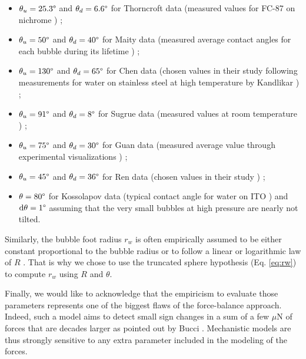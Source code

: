 \begin{itemize}
\item $\theta_{u}=25.3\degree$ and $\theta_{d} = 6.6\degree$ for Thorncroft data (measured values for FC-87 on nichrome \cite{thorncroft_bubble_2001}) ;
\item $\theta_{u} = 50\degree$ and $\theta_{d} = 40\degree$ for Maity data (measured average contact angles for each bubble during its lifetime \cite{maity_effect_2000}) ;
\item $\theta_{u} = 130\degree$ and $\theta_{d} = 65\degree$ for Chen data (chosen values in their study following measurements for water on stainless steel at high temperature by Kandlikar \etal \cite{kandlikar_contact_2002}) ;
\item $\theta_{u}=91\degree$ and $\theta_{d} = 8\degree$ for Sugrue data (measured values at room temperature \cite{sugrue_effects_2012}) ;
\item $\theta_{u} = 75\degree$ and $\theta_{d} = 30\degree$ for Guan data (measured average value through experimental visualizations \cite{guan_bubble_2015}) ;
\item $\theta_{u} = 45\degree$ and $\theta_{d} = 36\degree$ for Ren data (chosen values in their study \cite{ren_development_2020}) ;
\item $\theta = 80 \degree$ for Kossolapov data (typical contact angle for water on ITO \cite{kossolapov_experimental_2021}) and $\mathrm{d}\theta=1\degree$ assuming that the very small bubbles at high pressure are nearly not tilted.
\end{itemize}


Similarly, the bubble foot radius $r_{w}$ is often empirically assumed to be either constant \cite{klausner_vapor_1993} proportional to the bubble radius \cite{sugrue_modified_2016, mazzocco_reassessed_2018} or to follow a linear or logarithmic law of $R$ \cite{zhou_experimental_2020, guan_bubble_2015}. That is why we chose to use the truncated sphere hypothesis (Eq. \ref{eq:rw}) to compute $r_{w}$ using $R$ and $\theta$.

Finally, we would like to acknowledge that the empiricism to evaluate those parameters represents one of the biggest flaws of the force-balance approach. Indeed, such a model aims to detect small sign changes in a sum of a few $\mu\mathrm{N}$ of forces that are decades larger as pointed out by Bucci \etal \cite{bucci_not-so-subtle_2021}. Mechanistic models are thus strongly sensitive to any extra parameter included in the modeling of the forces.


